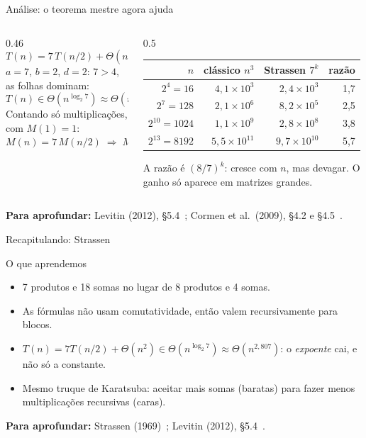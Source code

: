 \documentclass[aspectratio=169,xcolor=table]{beamer}
\newcommand{\fonte}[1]{%
  \vfill
  {\tiny\color{gray!55!black}\textbf{Para aprofundar:} #1\par}%
}
\begin{document}
\begin{frame}{Análise: o teorema mestre agora ajuda}
  \begin{columns}[T]
    \begin{column}{0.46\textwidth}
      \scriptsize
      \[ T(n) = 7\,T(n/2) + \Theta(n^2) \]
      $a=7$, $b=2$, $d=2$: $7 > 4$, as folhas dominam:
      \[ T(n)\in\Theta(n^{\log_2 7}) \approx \Theta(n^{2{,}807}). \]
      Contando só multiplicações, com $M(1)=1$:
      \[ M(n) = 7\,M(n/2) \;\Rightarrow\; M(2^k)=7^k = n^{\log_2 7}. \]
    \end{column}
    \begin{column}{0.5\textwidth}
      \centering\scriptsize
      \begin{tabular}{rrrr}
        \toprule
        $n$ & clássico $n^3$ & Strassen $7^k$ & razão \\
        \midrule
        $2^4=16$     & $4{,}1\times10^{3}$  & $2{,}4\times10^{3}$  & 1,7 \\
        $2^{7}=128$  & $2{,}1\times10^{6}$  & $8{,}2\times10^{5}$  & 2,5 \\
        $2^{10}=1024$& $1{,}1\times10^{9}$  & $2{,}8\times10^{8}$  & 3,8 \\
        $2^{13}=8192$& $5{,}5\times10^{11}$ & $9{,}7\times10^{10}$ & 5,7 \\
        \bottomrule
      \end{tabular}
      \medskip

      A razão é $(8/7)^k$: cresce com $n$, mas devagar.
      O ganho só aparece em matrizes grandes.
    \end{column}
  \end{columns}
  \fonte{Levitin (2012), \S 5.4~\cite{levitin2012introduction};
    Cormen et al.\ (2009), \S 4.2 e \S 4.5~\cite{cormen2009introduction}.}
\end{frame}

\begin{frame}{Recapitulando: Strassen}
  \begin{block}{O que aprendemos}
    \begin{itemize}\scriptsize
      \item 7 produtos e 18 somas no lugar de 8 produtos e 4 somas.
      \item As fórmulas não usam comutatividade, então valem recursivamente para blocos.
      \item $T(n)=7T(n/2)+\Theta(n^2)\in\Theta(n^{\log_2 7})\approx\Theta(n^{2{,}807})$: o
            \emph{expoente} cai, e não só a constante.
      \item Mesmo truque de Karatsuba: aceitar mais somas (baratas) para fazer menos
            multiplicações recursivas (caras).
    \end{itemize}
  \end{block}
  \fonte{Strassen (1969)~\cite{strassen1969gaussian};
    Levitin (2012), \S 5.4~\cite{levitin2012introduction}.}
\end{frame}
\end{document}
